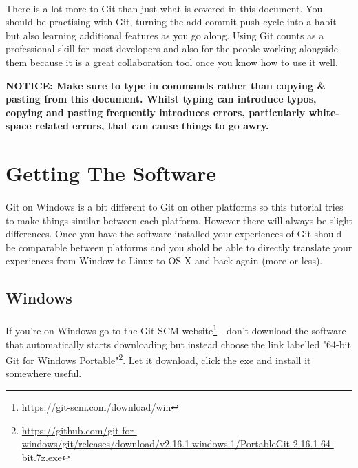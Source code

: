 \documentclass[10pt, a4paper]{article}
\begin{document}
\paragraph{} There is a lot more to Git than just what is covered in this document. You should be practising with Git, turning the add-commit-push cycle into a habit but also learning additional features as you go along. Using Git counts as a professional skill for most developers and also for the people working alongside them because it is a great collaboration tool once you know how to use it well.

\begin{framed}
{\bf{NOTICE:} Make sure to type in commands rather than copying \& pasting from this document. Whilst typing can introduce typos, copying and pasting frequently introduces errors, particularly white-space related errors, that can cause things to go awry.}
\end{framed}

\section{Getting The Software}
\paragraph{} Git on Windows is a bit different to Git on other platforms so this tutorial tries to make things similar between each platform. However there will always be slight differences. Once you have the software installed your experiences of Git should be comparable between platforms and you shold be able to directly translate your experiences from Window to Linux to OS X and back again (more or less).

\subsection{Windows}
\paragraph{} If you're on Windows go to the Git SCM website\footnote{\url{https://git-scm.com/download/win}}  - don't download the software that automatically starts downloading but instead choose the link labelled "64-bit Git for Windows Portable"\footnote{\url{https://github.com/git-for-windows/git/releases/download/v2.16.1.windows.1/PortableGit-2.16.1-64-bit.7z.exe}}. Let it download, click the exe and install it somewhere useful.
\end{document}
